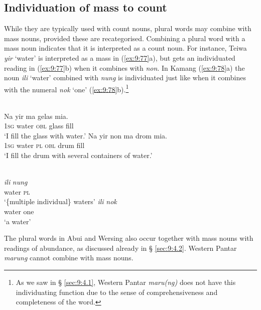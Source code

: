\subsection{Individuation of mass to count}
While they are typically used with count nouns, plural words may combine with mass nouns, provided these are recategorised. Combining a plural word with a mass noun indicates that it is interpreted as a count noun. For instance, Teiwa \textit{yir} `water' is interpreted as a mass in (\ref{ex:9:77}a), but gets an individuated reading in (\ref{ex:9:77}b) when it combines with \textit{non}. In Kamang (\ref{ex:9:78}a) the noun \textit{ili} `water' combined with \textit{nung} is individuated just like when it combines with the numeral \textit{nok} `one' (\ref{ex:9:78}b).\footnote{As we saw in {\S} \ref{sec:9:4.1}, Western Pantar \textit{maru(ng)} does not have this individuating function due to the sense of comprehensiveness and completeness of the word.}


\ea%
\label{ex:9:77}
 \\
\ea
\gll  Na yir ma gelas {mia}{{\textglotstop}}{.} \\
    \textsc{1sg} water \textsc{obl} glass fill \\
\glt `I fill the glass with water.'
\ex
\gll Na yir non ma drom {mia}{{\textglotstop}}{.} \\
   \textsc{1sg} water \textsc{pl} \textsc{obl} drum fill  \\
\glt  `I fill the drum with several containers of water.'
\z
\z







\ea%
\label{ex:9:78}
 \\
\ea
\gll\textit{ili} \textit{nung} \\
   water \textsc{pl} \\
 \glt `\{multiple individual\} waters' 
 \ex 
 \gll \textit{ili} \textit{nok}\\
  water one\\
\glt `a water'
\z
\z

The plural words in Abui and Wersing also occur together with mass nouns with readings of abundance, as discussed already in {\S} \ref{sec:9:4.2}. Western Pantar \textit{marung} cannot combine with mass nouns.

